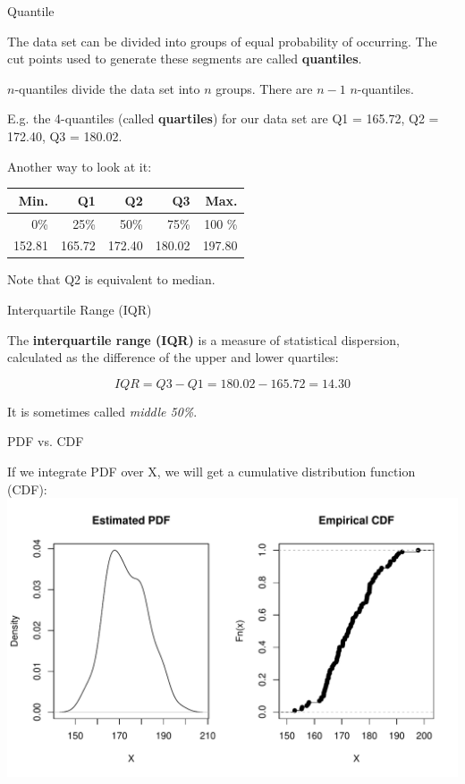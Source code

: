 \begin{frame}{Quantile}

    The data set can be divided into groups of equal probability of occurring. The cut points used to generate these segments are called \textbf{quantiles}.
    
    $n$-quantiles divide the data set into $n$ groups. There are $n-1$ $n$-quantiles.
    
    E.g. the 4-quantiles (called \textbf{quartiles}) for our data set are Q1 = 165.72, Q2 = 172.40, Q3 = 180.02.
    
    Another way to look at it:

    \begin{table}
        \begin{tabular}{r r r r r}
            Min. & Q1 & Q2 & Q3 & Max. \\ \hline
            0\% & 25\%  & 50\% & 75\% & 100 \% \\ \hline
            152.81 & 165.72 & 172.40 & 180.02 & 197.80\\
        \end{tabular}
    \end{table}

    Note that Q2 is equivalent to median.

\end{frame}

\begin{frame}{Interquartile Range (IQR)}

    The \textbf{interquartile range (IQR)} is a measure of statistical dispersion, calculated as the difference of the upper and lower quartiles:
    
    \begin{equation*}
        IQR = Q3 - Q1 = 180.02 - 165.72 = 14.30
    \end{equation*}

    It is sometimes called \emph{middle 50\%}.

\end{frame}

\begin{frame}{PDF vs. CDF}

    If we integrate PDF over X, we will get a cumulative distribution function (CDF):
    \includegraphics[width=\linewidth]{R/plots/distrib-pdf-vs-cdf}

\end{frame}

